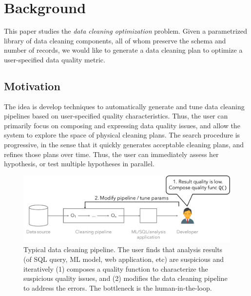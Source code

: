 \section{Background}
This paper studies the \emph{data cleaning optimization} problem. 
Given a parametrized library of data cleaning components, all of whom preserve the schema and number of records, we would like to generate a data cleaning plan to optimize a user-specified data quality metric.

\subsection{Motivation}
The idea is develop techniques to automatically generate and tune data cleaning pipelines based on user-specified quality characteristics.  Thus, the user can primarily focus on composing and expressing data quality issues, and allow the system to explore the space of physical cleaning plans.  The search procedure is progressive, in the sense that it quickly generates acceptable cleaning plans, and refines those plans over time.  Thus, the user can immediately assess her hypothesis, or test multiple hypotheses in parallel.


\begin{figure}[t]
  \centering
 \includegraphics[width=\columnwidth]{figures/user-pipeline}
 \caption{\small Typical data cleaning pipeline.  The user finds that analysis results (of SQL query, ML model, web application, etc) are suspicious and iteratively (1) composes a quality function to characterize the suspicious quality issues, and (2) modifies the data cleaning pipeline to address the errors.  The bottleneck is the human-in-the-loop.  \label{fig:user-pipeline}}
\end{figure}


